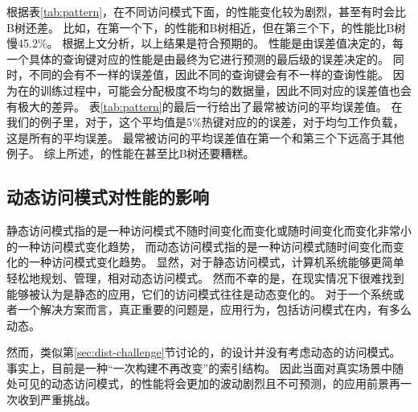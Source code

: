 根据表\ref{tab:pattern}，在不同访问模式下面，{\li}的性能变化较为剧烈，甚至有时会比B树还差。
比如，在第一个{\skewwl}下，{\li}的性能和B树相近，但在第三个{\skewwl}下，{\li}的性能比B树慢45.2\%。
根据上文分析，以上结果是符合预期的。
{\li}性能是由误差值决定的，每一个具体的查询键对应的性能是由最终为它进行预测的最后级{\model}的误差决定的。
同时，不同的{\model}会有不一样的误差值，因此不同的查询键会有不一样的查询性能。
因为在{\rmi}的训练过程中，{\model}可能会分配极度不均匀的数据量，因此不同{\model}对应的误差值也会有极大的差异。
表\ref{tab:pattern}的最后一行给出了最常被访问{\model}的平均误差值。
在我们的例子里，对于{\skewwl}，这个平均值是5\%热键对应的{\model}的误差，对于均匀工作负载，这是所有{\model}的平均误差。
最常被访问{\model}的平均误差值在第一个{\skewwl}和第三个{\skewwl}下远高于其他例子。
综上所述，{\li}的性能在{\skewwl}甚至比B树还要糟糕。


\subsection{动态访问模式对{\li}性能的影响}

静态访问模式指的是一种访问模式不随时间变化而变化或随时间变化而变化非常小的一种访问模式变化趋势，
而动态访问模式指的是一种访问模式随时间变化而变化的一种访问模式变化趋势。
显然，对于静态访问模式，计算机系统能够更简单轻松地规划、管理，相对动态访问模式。
然而不幸的是，在现实情况下很难找到能够被认为是静态的应用，它们的访问模式往往是动态变化的。
对于一个系统或者一个解决方案而言，真正重要的问题是，应用行为，包括访问模式在内，有多么动态。


然而，类似第\ref{sec:dist-challenge}节讨论的，{\li}的设计并没有考虑动态的访问模式。
事实上，{\li}目前是一种``一次构建不再改变''的索引结构。
因此当面对真实场景中随处可见的动态访问模式，{\li}的性能将会更加的波动剧烈且不可预测，{\li}的应用前景再一次收到严重挑战。
